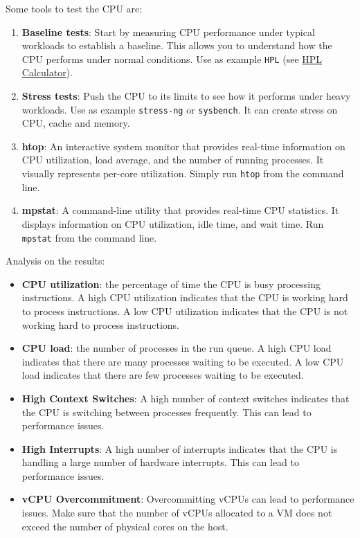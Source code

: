 Some tools to test the CPU are:
\begin{enumerate}
    \item \textbf{Baseline tests}: Start by measuring CPU performance under typical workloads to establish a baseline.
    This allows you to understand how the CPU performs under normal conditions. Use as example \texttt{HPL} (see \href{https://hpl-calculator.sourceforge.net/}{HPL Calculator}).
    \item \textbf{Stress tests}: Push the CPU to its limits to see how it performs under heavy workloads. Use as example \texttt{stress-ng} or \texttt{sysbench}. It can create stress on CPU, cache and memory.
    \item \textbf{htop}: An interactive system monitor that provides real-time information on CPU utilization,
    load average, and the number of running processes. It visually represents per-core
    utilization. Simply run \texttt{htop} from the command line.
    \item \textbf{mpstat}: A command-line utility that provides real-time CPU statistics. It displays
    information on CPU utilization, idle time, and wait time. Run \texttt{mpstat} from the
    command line.
\end{enumerate}

Analysis on the results:
\begin{itemize}
    \item \textbf{CPU utilization}: the percentage of time the CPU is busy processing instructions. A high CPU utilization indicates that the CPU is working hard to process instructions. A low CPU utilization indicates that the CPU is not working hard to process instructions.
    \item \textbf{CPU load}: the number of processes in the run queue. A high CPU load indicates that there are many processes waiting to be executed. A low CPU load indicates that there are few processes waiting to be executed.
    \item \textbf{High Context Switches}: A high number of context switches indicates that the CPU is switching between processes frequently. This can lead to performance issues.
    \item \textbf{High Interrupts}: A high number of interrupts indicates that the CPU is handling a large number of hardware interrupts. This can lead to performance issues.
    \item \textbf{vCPU Overcommitment}: Overcommitting vCPUs can lead to performance issues. Make sure that the number of vCPUs allocated to a VM does not exceed the number of physical cores on the host.
\end{itemize}

